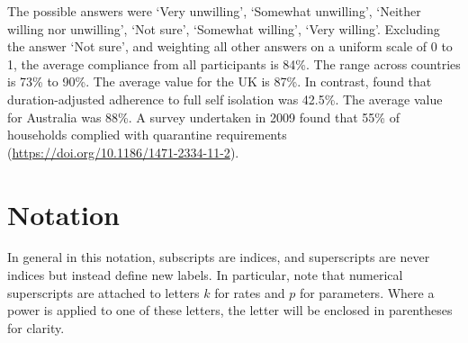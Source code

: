 \documentclass[
]{article}
\begin{document}
The possible answers were `Very unwilling', `Somewhat unwilling', `Neither willing nor unwilling', `Not sure', `Somewhat willing', `Very willing'. Excluding the answer `Not sure', and weighting all other answers on a uniform scale of 0 to 1, the average compliance from all participants is 84\%. The range across countries is 73\% to 90\%. The average value for the UK is 87\%. In contrast, \citet{Smith2021} found that duration-adjusted adherence to full self isolation was 42.5\%. The average value for Australia was 88\%. A survey undertaken in 2009 found that 55\% of households complied with quarantine requirements (\url{https://doi.org/10.1186/1471-2334-11-2}).

\newpage

\section{Notation}\label{notation}

In general in this notation, subscripts are indices, and superscripts are never indices but instead define new labels. In particular, note that numerical superscripts are attached to letters \(k\) for rates and \(p\) for parameters. Where a power is applied to one of these letters, the letter will be enclosed in parentheses for clarity.
\end{document}
